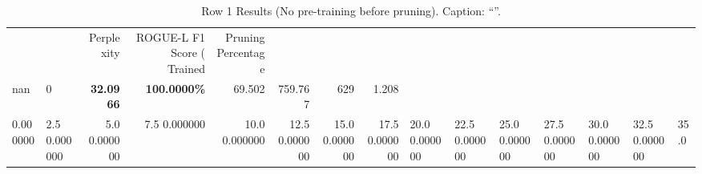 \begin{table}
\caption{Row 1 Results (No pre-training before pruning). \ifshowcaption{}Caption: ``''.\fi}
\label{tab:evaluation-pipeline-1-untrained}
\begin{tabular}{llrrrrrr}
 &  & Perplexity & ROGUE-L F1 Score (%
Trained & Pruning Percentage &  &  &  &  &  &  \\
nan & 0 & \bfseries 32.0966 & \bfseries 100.0000\% & 69.502 & 759.767 & 629 & 1.208 \\
0.000000 & 2.5%
0.000000 & 5.0%
0.000000 & 7.5%
0.000000 & 10.0%
0.000000 & 12.5%
0.000000 & 15.0%
0.000000 & 17.5%
0.000000 & 20.0%
0.000000 & 22.5%
0.000000 & 25.0%
0.000000 & 27.5%
0.000000 & 30.0%
0.000000 & 32.5%
0.000000 & 35.0%

\end{tabular}
\end{table}
